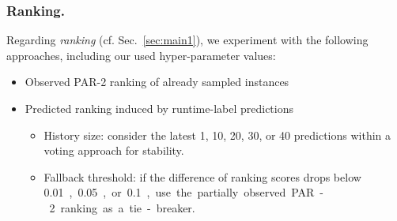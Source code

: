 \documentclass[runningheads]{llncs}
\begin{document}
\subsubsection{Ranking.}
Regarding \emph{ranking} (cf. Sec.~\ref{sec:main1}), we experiment with the following approaches, including our used hyper-parameter values:
\begin{itemize}
  \item Observed PAR-2 ranking of already sampled instances
  \item Predicted ranking induced by runtime-label predictions
  \begin{itemize}
    \item History size: consider the latest 1, 10, 20, 30, or 40 predictions within a voting approach for stability.
    \item Fallback threshold: if the difference of ranking scores drops below \SI{0.01}, \SI{0.05}, or \SI{0.1}, use the partially observed PAR-2 ranking as a tie-breaker.
  \end{itemize}
\end{itemize}
\end{document}
